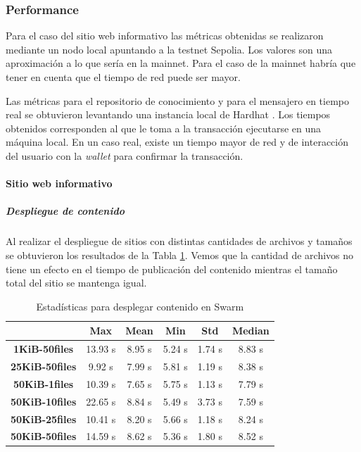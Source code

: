 \subsubsection{Performance\label{performance-blockchain}}

Para el caso del sitio web informativo las métricas obtenidas se realizaron mediante un nodo local apuntando a la testnet Sepolia. Los valores son una aproximación a lo que sería en la mainnet. Para el caso de la mainnet habría que tener en cuenta que el tiempo de red puede ser mayor.

Las métricas para el repositorio de conocimiento y para el mensajero en tiempo real se obtuvieron levantando una instancia local de Hardhat \cite{hardhat}. Los tiempos obtenidos corresponden al que le toma a la transacción ejecutarse en una máquina local. En un caso real, existe un tiempo mayor de red y de interacción del usuario con la \textit{wallet} para confirmar la transacción.

\paragraph{Sitio web informativo}

\subparagraph{Despliegue de contenido}

Al realizar el despliegue de sitios con distintas cantidades de archivos y tamaños se obtuvieron los resultados de la Tabla \ref{table:estadisticas-despliegue-swarm}. Vemos que la cantidad de archivos no tiene un efecto en el tiempo de publicación del contenido mientras el tamaño total del sitio se mantenga igual.

\setlength\tabcolsep{10pt}
\begin{table}[H]
    \centering
    \begin{tabular}{|c|c|c|c|c|c|}
    \hline
    & \textbf{Max} & \textbf{Mean} & \textbf{Min} & \textbf{Std} & \textbf{Median} \\
    \hline
    \textbf{1KiB-50files} & 13.93 s & 8.95 s & 5.24 s & 1.74 s & 8.83 s \\
    \hline
    \textbf{25KiB-50files} & 9.92 s & 7.99 s & 5.81 s & 1.19 s & 8.38 s \\
    \hline
    \textbf{50KiB-1files} & 10.39 s & 7.65 s & 5.75 s & 1.13 s & 7.79 s \\
    \hline
    \textbf{50KiB-10files} & 22.65 s & 8.84 s & 5.49 s & 3.73 s & 7.59 s \\
    \hline
    \textbf{50KiB-25files} & 10.41 s & 8.20 s & 5.66 s & 1.18 s & 8.24 s \\
    \hline
    \textbf{50KiB-50files} & 14.59 s & 8.62 s & 5.36 s & 1.80 s & 8.52 s \\
    \hline
    \end{tabular}
    \caption{Estadísticas para desplegar contenido en Swarm}
    \label{table:estadisticas-despliegue-swarm}
\end{table}

